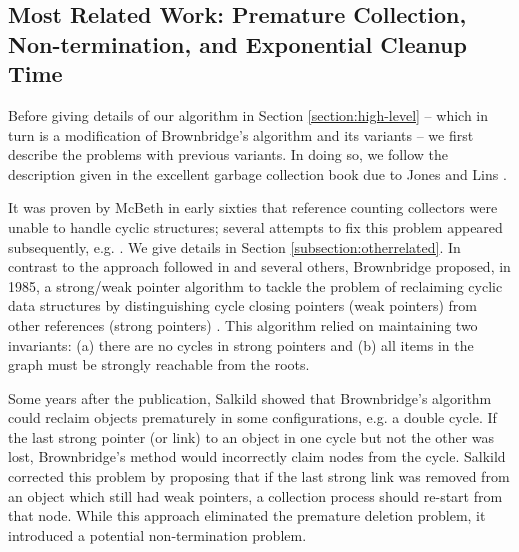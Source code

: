 \subsection{Most Related Work: Premature Collection, Non-termination, and Exponential Cleanup Time}
\label{section:exponential}
Before giving details of our algorithm in Section \ref{section:high-level} %
-- which in turn is a modification of Brownbridge's algorithm and its variants \cite{Brownbridge1985,Salkild1987,Pepels1988} -- we first describe the problems with previous variants. In doing so, we follow the description given in the excellent garbage collection book due to Jones and Lins \cite{Jones1996}.

It was proven by McBeth \cite{McBeth1963} in early sixties that reference counting collectors were unable to handle cyclic structures; several attempts to fix this problem appeared subsequently, e.g. \cite{Friedman1979,Bobrow1980,Lins2008}. We give details in Section \ref{subsection:otherrelated}.
In contrast to the approach followed in \cite{Friedman1979,Bobrow1980,Lins2008} and several others,
Brownbridge \cite{Brownbridge1985} proposed, in 1985, a strong/weak pointer algorithm to tackle the problem of reclaiming cyclic data structures by distinguishing cycle closing pointers (weak pointers) from other references (strong pointers) \cite{Jones1996}. %
This algorithm relied on maintaining two invariants: (a) there are no cycles in strong pointers and (b) all items in the graph must be strongly reachable from the roots.

Some years after the publication, Salkild \cite{Salkild1987} showed that Brownbridge's algorithm
\cite{Brownbridge1985} could reclaim objects prematurely in some
configurations, e.g. a double cycle. If the last strong pointer (or link) to
an object in one cycle but not the other was lost, Brownbridge's
method would incorrectly claim nodes from the cycle.
Salkild \cite{Salkild1987} corrected this problem by proposing
that if the last strong link was removed from an object which still
had weak pointers, a collection process should re-start from that node.
While this approach eliminated the premature deletion problem, it introduced a
potential non-termination problem.

